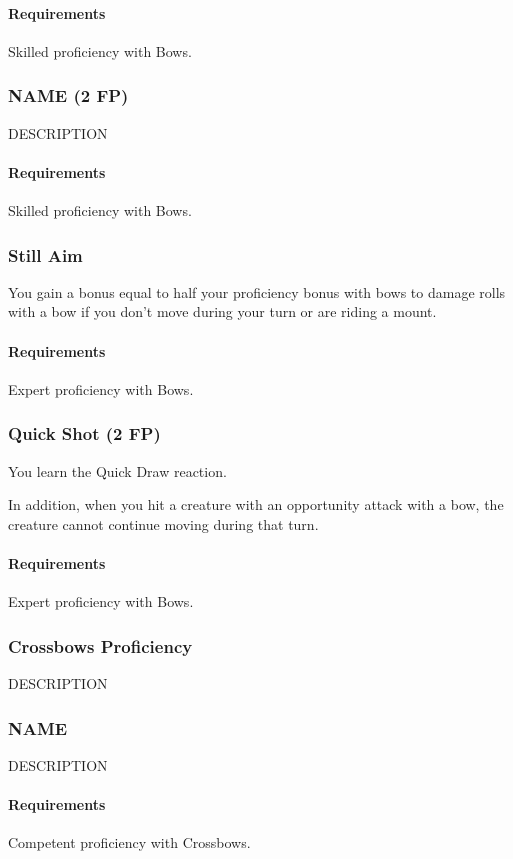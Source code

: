    \paragraph{Requirements} Skilled proficiency with Bows.
\subsubsection{NAME (2 FP)} \label{feat::name}
    DESCRIPTION
    \paragraph{Requirements} Skilled proficiency with Bows.
\subsubsection{Still Aim} \label{feat::stillaim}
    You gain a bonus equal to half your proficiency bonus with bows to damage rolls with a bow if you don't move during your turn or are riding a mount.
    \paragraph{Requirements} Expert proficiency with Bows.
\subsubsection{Quick Shot (2 FP)} \label{feat::quickshot}
    You learn the Quick Draw reaction.

    In addition, when you hit a creature with an opportunity attack with a bow, the creature cannot continue moving during that turn.
    \paragraph{Requirements} Expert proficiency with Bows.
\subsubsection{Crossbows Proficiency} \label{feat::name}
    DESCRIPTION
\subsubsection{NAME} \label{feat::name}
    DESCRIPTION
    \paragraph{Requirements} Competent proficiency with Crossbows.
